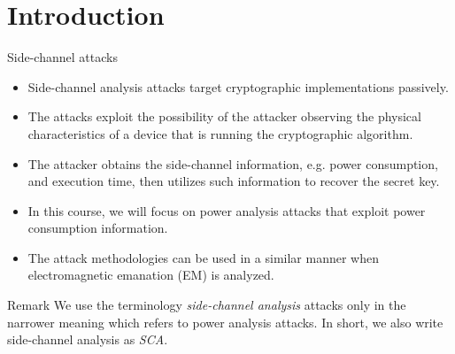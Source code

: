 \section{Introduction}
\begin{frame}{\VideoName}
    \tableofcontents[currentsection]
\end{frame}

\begin{frame}{Side-channel attacks}
    \begin{itemize}
        \item Side-channel analysis attacks target cryptographic implementations passively.
       \item The attacks exploit the possibility of the attacker observing the physical characteristics of a device that is running the cryptographic algorithm.
        \item The attacker obtains the side-channel information, e.g. power consumption, and execution time, then utilizes such information to recover the secret key.
     \item  In this course, we will focus on power analysis attacks that exploit power consumption information.
      \item The attack methodologies can be used in a similar manner when electromagnetic emanation (EM) is analyzed.
    \end{itemize}
\begin{alertblock}{Remark}
We use the terminology \textit{side-channel analysis} attacks only in the narrower meaning which refers to power analysis attacks.
In short, we also write side-channel analysis as \textit{SCA}.
\end{alertblock}
\end{frame}

